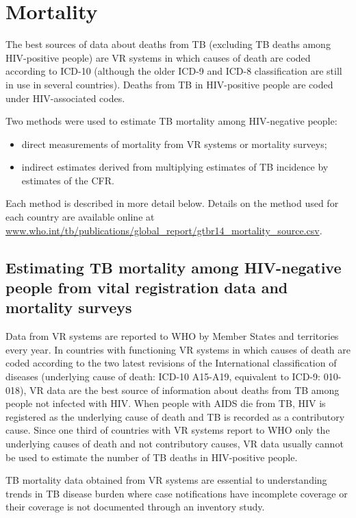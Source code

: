 \section{Mortality}

The best sources of data about deaths from TB (excluding TB deaths among HIV-positive people) are VR systems in which causes of death are coded according to ICD-10 (although the older ICD-9 and ICD-8 classification are still in use in several countries). Deaths from TB in HIV-positive people are coded under HIV-associated codes. 

Two methods were used to estimate TB mortality among HIV-negative people: 
\begin{itemize}
\item direct measurements of mortality from VR systems or mortality surveys;
\item indirect estimates derived from multiplying estimates of TB incidence by estimates of the CFR. 
\end{itemize}

Each method is described in more detail below. Details on the method used for each country are available online at \url{www.who.int/tb/publications/global_report/gtbr14_mortality_source.csv}.

\subsection{Estimating TB mortality among HIV-negative people from vital registration data and mortality surveys}

Data from VR systems are reported to WHO by Member States and territories every year. In countries with functioning VR systems in which causes of death are coded according to the two latest revisions of the International classification of diseases (underlying cause of death: ICD-10 A15-A19, equivalent to ICD-9: 010-018), VR data are the best source of information about deaths from TB among people not infected with HIV. When people with AIDS die from TB, HIV is registered as the underlying cause of death and TB is recorded as a contributory cause. Since one third of countries with VR systems report to WHO only the underlying causes of death and not contributory causes, VR data usually cannot be used to estimate the number of TB deaths in HIV-positive people. 

TB mortality data obtained from VR systems are essential to understanding trends in TB disease burden where case notifications have incomplete coverage or their coverage is not documented through an inventory study. 

